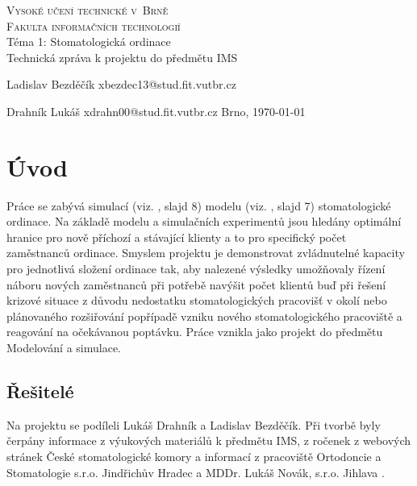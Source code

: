 \documentclass[a4paper,11pt,titlepage]{article}
\begin{document}
\begin{titlepage}
	
	\begin{center}
		{\Huge\textsc{Vysoké učení technické v~Brně}}\\
		\medskip
		{\huge\textsc{Fakulta informačních technologií}}\\
		{\huge Téma 1: Stomatologická ordinace}\\
		\medskip
		{\LARGE Technická zpráva k projektu do předmětu IMS}\\
	\end{center}
	
	Ladislav Bezděčík xbezdec13@stud.fit.vutbr.cz \hfill{} 

	Drahník Lukáš xdrahn00@stud.fit.vutbr.cz \hfill{Brno, \today}
	
\end{titlepage}

\newpage

\tableofcontents

\newpage

\section{Úvod}

Práce se zabývá simulací (viz. \cite{ims}, slajd 8) modelu (viz. \cite{ims}, slajd 7) stomatologické ordinace. Na základě modelu a simulačních experimentů jsou hledány optimální hranice pro nově příchozí a stávající klienty a to pro specifický počet zaměstnanců ordinace. 
\newline
Smyslem projektu je demonstrovat zvládnutelné kapacity pro jednotlivá složení ordinace tak, aby nalezené výsledky umožňovaly řízení náboru nových zaměstnanců při potřebě navýšit počet klientů buď při řešení krizové situace z důvodu nedostatku stomatologických pracovišť v okolí nebo plánovaného rozšiřování popřípadě vzniku nového stomatologického pracoviště a reagování na očekávanou poptávku. 
\newline
Práce vznikla jako projekt do předmětu Modelování a simulace. 

\subsection{Řešitelé}

Na projektu se podíleli Lukáš Drahník a Ladislav Bezděčík. Při tvorbě byly čerpány informace z výukových materiálů k předmětu IMS, z ročenek z webových stránek České stomatologické komory \cite{ceskastomatologickakomorarocenky} a informací z pracoviště Ortodoncie a Stomatologie s.r.o. Jindřichův Hradec \cite{soldanova} a MDDr. Lukáš Novák, s.r.o. Jihlava \cite{lukasnovak}.
\end{document}
